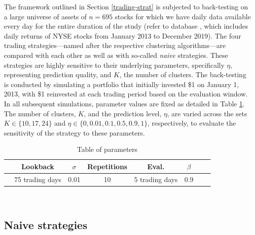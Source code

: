 \documentclass[sigconf]{acmart}
\begin{document}
The framework outlined in Section \ref{trading-strat} is subjected to back-testing on a large universe of assets of $n=695$ stocks for which we have daily data available every day for the entire duration of the study (refer to database \cite{WhartonDATA}, which includes daily returns of NYSE stocks from January 2013 to December 2019). The four trading strategies—named after the respective clustering algorithms—are compared with each other as well as with so-called \textit{naive} strategies. These strategies are highly sensitive to their underlying parameters, specifically $\eta$, representing prediction quality, and $K$, the number of clusters. The back-testing is conducted by simulating a portfolio that initially invested \$1 on January 1, 2013, with \$1 reinvested at each trading period based on the evaluation window. In all subsequent simulations, parameter values are fixed as detailed in Table \ref{params}. The number of clusters, \( K \), and the prediction level, $\eta$, are varied across the sets $K \in \{10, 17, 24\}$ and $\eta \in \{0, 0.01, 0.1, 0.5, 0.9, 1\}$, respectively, to evaluate the sensitivity of the strategy to these parameters.

\vspace{3pt}
\begin{table}[H]
  \caption{Table of parameters}
  \label{params}
  \begin{tabular}{cccccccl}
    \toprule
     &  Lookback & $\sigma$ & Repetitions &  Eval. & $\beta$ \\
    \midrule
     & 75 trading days & 0.01 & 10 & 5 trading days& $0.9$ \\
  \bottomrule
\end{tabular}\\
\end{table}

 

\subsection{Naive strategies}
\end{document}
